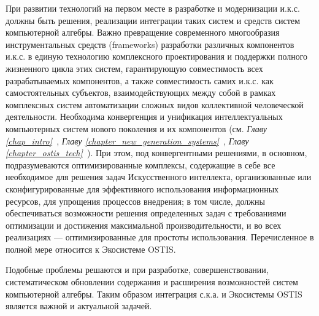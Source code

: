При развитии технологий на первом месте в разработке и модернизации и.к.с. должны быть решения, реализации интеграции таких систем и средств систем компьютерной алгебры. 
Важно превращение современного многообразия инструментальных средств (frameworks) разработки различных компонентов и.к.с. в единую технологию комплексного проектирования и поддержки полного жизненного цикла этих систем, гарантирующую совместимость всех разрабатываемых компонентов, а также совместимость самих и.к.с. как самостоятельных субъектов, взаимодействующих между собой в рамках комплексных систем автоматизации сложных видов коллективной человеческой деятельности. Необходима конвергенция и унификация интеллектуальных компьютерных систем нового поколения и их компонентов (см. \textit{Главу \ref{chap_intro}~}, \textit{Главу \ref{chapter_new_generation_systems}~}, \textit{Главу \ref{chapter_ostis_tech}~}). 
При этом, под конвергентными решениями, в основном, подразумеваются оптимизированные комплексы, содержащие в себе все необходимое для решения задач Искусственного интеллекта, организованные или сконфигурированные для эффективного использования информационных ресурсов, для упрощения процессов внедрения; в том числе, должны обеспечиваться возможности решения определенных задач с требованиями оптимизации и достижения максимальной производительности, и во всех реализациях --- оптимизированные для простоты использования. Перечисленное в полной мере относится к Экосистеме OSTIS. 

Подобные проблемы решаются и при разработке, совершенствовании, систематическом обновлении содержания и расширения возможностей систем компьютерной алгебры. Таким образом интеграция с.к.а. и Экосистемы OSTIS является важной и актуальной задачей.

